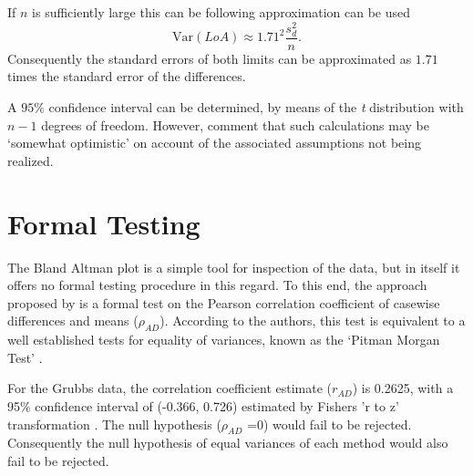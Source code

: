 \documentclass[12pt, a4paper]{report}
\theoremstyle{plain}
\theoremstyle{definition}
\theoremstyle{remark}
\begin{document}
	If $n$ is sufficiently large this can be following approximation
	can be used
	\[
	\mbox{Var}(LoA) \approx 1.71^{2}\frac{s_{d}^{2}}{n}.
	\]
	Consequently the standard errors of both limits can be
	approximated as $1.71$ times the standard error of the
	differences.
	
	A $95\%$ confidence interval can be determined, by means of the
	\emph{t} distribution with $n-1$ degrees of freedom. However, \citet*{BA99} comment that such calculations  may be `somewhat optimistic' on account of the associated assumptions not being realized.
	
	


\newpage
		
\section{Formal Testing}
The Bland Altman plot is a simple tool for inspection of the data,
but in itself it offers no formal testing procedure in this
regard. To this end, the approach proposed by \citet{BA83} is a
formal test on the Pearson correlation coefficient  of casewise
differences and means ($\rho_{AD}$). According to the authors,
this test is equivalent to a well established tests for equality
of variances, known as the `Pitman Morgan Test' \citep{Pitman,
	Morgan}.

For the Grubbs data, the correlation coefficient estimate
($r_{AD}$) is 0.2625, with a 95\% confidence interval of (-0.366,
0.726) estimated by Fishers 'r to z' transformation \citep{Cohen}.
The null hypothesis ($\rho_{AD}$ =0) would fail to be rejected.
Consequently the null hypothesis of equal variances of each method
would also fail to be rejected.
\end{document}

